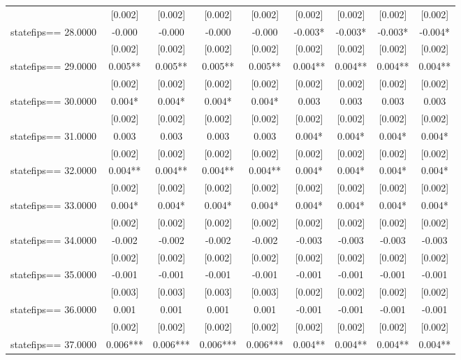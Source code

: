 \documentclass[]{article}
\begin{document}
\begin{tabular}{lcccccccc}
 & [0.002] & [0.002] & [0.002] & [0.002] & [0.002] & [0.002] & [0.002] & [0.002] \\
statefips==    28.0000 & -0.000 & -0.000 & -0.000 & -0.000 & -0.003* & -0.003* & -0.003* & -0.004* \\
 & [0.002] & [0.002] & [0.002] & [0.002] & [0.002] & [0.002] & [0.002] & [0.002] \\
statefips==    29.0000 & 0.005** & 0.005** & 0.005** & 0.005** & 0.004** & 0.004** & 0.004** & 0.004** \\
 & [0.002] & [0.002] & [0.002] & [0.002] & [0.002] & [0.002] & [0.002] & [0.002] \\
statefips==    30.0000 & 0.004* & 0.004* & 0.004* & 0.004* & 0.003 & 0.003 & 0.003 & 0.003 \\
 & [0.002] & [0.002] & [0.002] & [0.002] & [0.002] & [0.002] & [0.002] & [0.002] \\
statefips==    31.0000 & 0.003 & 0.003 & 0.003 & 0.003 & 0.004* & 0.004* & 0.004* & 0.004* \\
 & [0.002] & [0.002] & [0.002] & [0.002] & [0.002] & [0.002] & [0.002] & [0.002] \\
statefips==    32.0000 & 0.004** & 0.004** & 0.004** & 0.004** & 0.004* & 0.004* & 0.004* & 0.004* \\
 & [0.002] & [0.002] & [0.002] & [0.002] & [0.002] & [0.002] & [0.002] & [0.002] \\
statefips==    33.0000 & 0.004* & 0.004* & 0.004* & 0.004* & 0.004* & 0.004* & 0.004* & 0.004* \\
 & [0.002] & [0.002] & [0.002] & [0.002] & [0.002] & [0.002] & [0.002] & [0.002] \\
statefips==    34.0000 & -0.002 & -0.002 & -0.002 & -0.002 & -0.003 & -0.003 & -0.003 & -0.003 \\
 & [0.002] & [0.002] & [0.002] & [0.002] & [0.002] & [0.002] & [0.002] & [0.002] \\
statefips==    35.0000 & -0.001 & -0.001 & -0.001 & -0.001 & -0.001 & -0.001 & -0.001 & -0.001 \\
 & [0.003] & [0.003] & [0.003] & [0.003] & [0.002] & [0.002] & [0.002] & [0.002] \\
statefips==    36.0000 & 0.001 & 0.001 & 0.001 & 0.001 & -0.001 & -0.001 & -0.001 & -0.001 \\
 & [0.002] & [0.002] & [0.002] & [0.002] & [0.002] & [0.002] & [0.002] & [0.002] \\
statefips==    37.0000 & 0.006*** & 0.006*** & 0.006*** & 0.006*** & 0.004** & 0.004** & 0.004** & 0.004** \\

\end{tabular}
\end{document}

